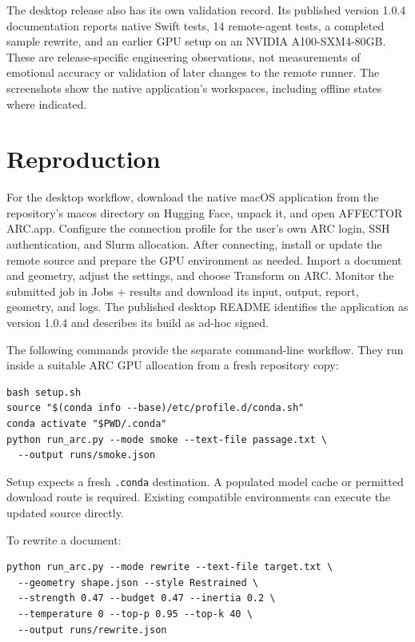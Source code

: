 \documentclass[manuscript,screen,nonacm]{acmart}
\begin{document}
The desktop release also has its own validation record. Its published version 1.0.4 documentation reports native Swift tests, 14 remote-agent tests, a completed sample rewrite, and an earlier GPU setup on an NVIDIA A100-SXM4-80GB. These are release-specific engineering observations, not measurements of emotional accuracy or validation of later changes to the remote runner. The screenshots show the native application's workspaces, including offline states where indicated.

\section{Reproduction}\label{reproduction}

For the desktop workflow, download the native macOS application from the repository's macos directory on Hugging Face, unpack it, and open AFFECTOR ARC.app. Configure the connection profile for the user's own ARC login, SSH authentication, and Slurm allocation. After connecting, install or update the remote source and prepare the GPU environment as needed. Import a document and geometry, adjust the settings, and choose Transform on ARC. Monitor the submitted job in Jobs + results and download its input, output, report, geometry, and logs. The published desktop README identifies the application as version 1.0.4 and describes its build as ad-hoc signed.

The following commands provide the separate command-line workflow. They run inside a suitable ARC GPU allocation from a fresh repository copy:

\begin{verbatim}
bash setup.sh
source "$(conda info --base)/etc/profile.d/conda.sh"
conda activate "$PWD/.conda"
python run_arc.py --mode smoke --text-file passage.txt \
  --output runs/smoke.json
\end{verbatim}

Setup expects a fresh \nolinkurl{.conda} destination. A populated model
cache or permitted download route is required. Existing compatible
environments can execute the updated source directly.

To rewrite a document:

\begin{verbatim}
python run_arc.py --mode rewrite --text-file target.txt \
  --geometry shape.json --style Restrained \
  --strength 0.47 --budget 0.47 --inertia 0.2 \
  --temperature 0 --top-p 0.95 --top-k 40 \
  --output runs/rewrite.json
\end{verbatim}
\end{document}
